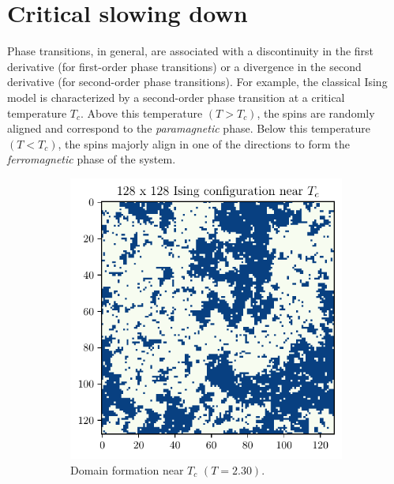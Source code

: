 \documentclass[../thesis_main.tex]{subfiles}
\begin{document}
\section{Critical slowing down}
Phase transitions, in general, are associated with a discontinuity in the first derivative (for first-order phase transitions) or a divergence in the second derivative (for second-order phase transitions). For example, the classical Ising model is characterized by a second-order phase transition at a critical temperature $T_c$. Above this temperature $(T>T_c)$, the spins are randomly aligned and correspond to the \textit{paramagnetic} phase. Below this temperature $(T<T_c)$, the spins majorly align in one of the directions to form the \textit{ferromagnetic} phase of the system.
\begin{figure}[!htb]
    \centering
    \begin{subfigure}[b]{0.4\textwidth}  %
        \centering
        \includegraphics[width=\textwidth]{images/monte_carlo/ising_config_128.pdf}
        \caption{Domain formation near $T_c$ $(T=2.30)$.}
        \label{domain}
    \end{subfigure}
    \hspace{1em}  %
    \begin{subfigure}[b]{0.5\textwidth}

\end{subfigure}
\end{figure}
\end{document}

